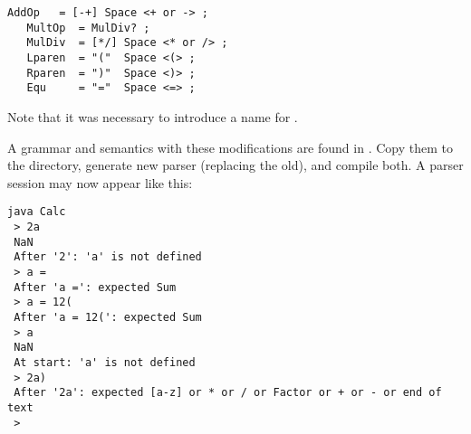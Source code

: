 \small
\begin{Verbatim}[frame=single,framesep=2mm,samepage=true,xleftmargin=15mm,xrightmargin=15mm,baselinestretch=0.8]
   AddOp   = [-+] Space <+ or -> ;
   MultOp  = MulDiv? ;
   MulDiv  = [*/] Space <* or /> ;
   Lparen  = "("  Space <(> ;
   Rparen  = ")"  Space <)> ;
   Equ     = "="  Space <=> ;
\end{Verbatim}
\normalsize

Note that it was necessary to introduce a name for \tx{[*/]}.

A grammar and semantics with these modifications are found in .
Copy them to the  directory, generate new parser (replacing the old), and compile both.
A parser session may now appear like this:

\small
\begin{Verbatim}[samepage=true,xleftmargin=15mm,baselinestretch=0.8]
 java Calc
 > 2a
 NaN
 After '2': 'a' is not defined
 > a =
 After 'a =': expected Sum 
 > a = 12(
 After 'a = 12(': expected Sum
 > a
 NaN
 At start: 'a' is not defined 
 > 2a)
 After '2a': expected [a-z] or * or / or Factor or + or - or end of text
 >
\end{Verbatim}
\normalsize


